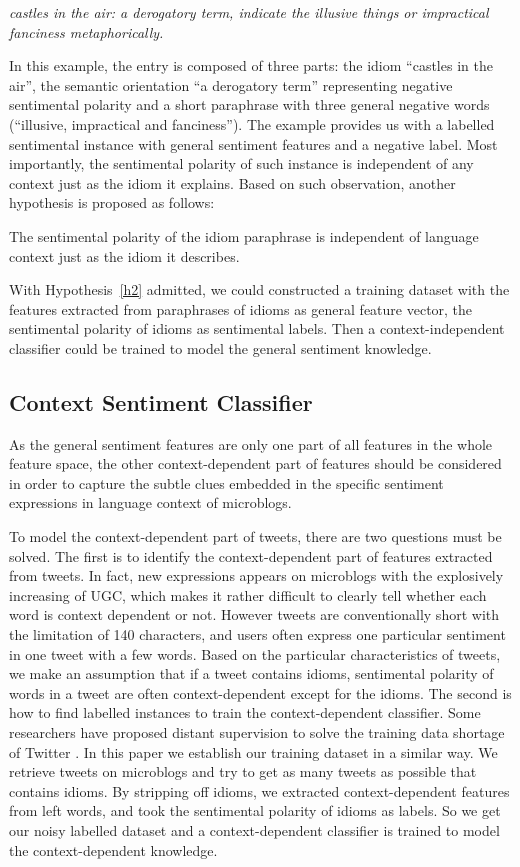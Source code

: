 \textit{castles in the air: a derogatory term, indicate the illusive things or impractical fanciness metaphorically.}

In this example, the entry is composed of three parts: the idiom ``castles in the air'', the semantic orientation ``a derogatory term'' representing negative
sentimental polarity and a short paraphrase with three general negative words (``illusive, impractical and fanciness''). 
The example provides us with a labelled sentimental instance with general sentiment features and a negative label.
Most importantly, the sentimental polarity of such instance is independent of any context just as the idiom it explains. 
Based on such observation, another hypothesis is proposed as follows:
\begin{hypothesis}
\label{h2}
The sentimental polarity of the idiom paraphrase is independent of language context just as the idiom it describes.
\end{hypothesis}
With Hypothesis~\ref{h2} admitted, we could constructed a training dataset with the features extracted from paraphrases of idioms as general feature vector, the sentimental polarity of idioms as sentimental labels. 
Then a context-independent classifier could be trained to model the general sentiment knowledge.

\subsection{Context Sentiment Classifier}
\label{context}

As the general sentiment features are only one part of all features in the whole feature space, the other context-dependent part of features should be considered in order to capture the subtle clues embedded in the specific sentiment expressions in language context of microblogs.

To model the context-dependent part of tweets, there are two questions must be solved. 
The first is to identify the context-dependent part of features extracted from tweets. 
In fact, new expressions appears on microblogs with the explosively increasing of UGC, which makes it rather difficult to clearly tell whether each word is context dependent or not. 
However tweets are conventionally short with the limitation of 140 characters, and users often express one particular sentiment in one tweet with a few words. 
Based on the particular characteristics of tweets, we make an assumption that if a tweet contains idioms,  sentimental polarity of words in a tweet are often context-dependent except for the idioms. 
The second is how to find labelled instances to train the context-dependent classifier. 
Some researchers have proposed distant supervision to solve the training data shortage of Twitter \cite{xsongx:b36,xsongx:b37}. 
In this paper we establish our training dataset in a similar way.
We retrieve tweets on microblogs and try to get as many tweets as possible that contains idioms. 
By stripping off idioms, we extracted context-dependent features from left words, and took the sentimental polarity of idioms as labels. 
So we get our noisy labelled dataset and a context-dependent classifier is trained to model the context-dependent knowledge.

